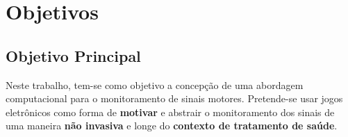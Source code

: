 







% 

\section{Objetivos}
\subsection{Objetivo Principal}
Neste trabalho, tem-se como objetivo a concepção de uma abordagem computacional para o monitoramento de sinais motores. Pretende-se usar jogos eletrônicos como forma de \textbf{motivar} e abstrair o monitoramento dos sinais de uma maneira \textbf{não invasiva} e longe do \textbf{contexto de tratamento de saúde}.


